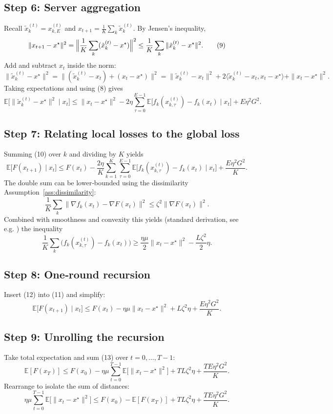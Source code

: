 \documentclass[11pt]{article}
\begin{document}
\subsection*{Step 6: Server aggregation}
Recall $\tilde x_{k}^{(t)}=x_{k,E}^{(t)}$ and $x_{t+1}=\frac1K\sum_{k}\tilde x_{k}^{(t)}$. By Jensen’s inequality,
\[
\|x_{t+1}-x^\star\|^2
= \Bigl\|\frac1K\sum_{k}( \tilde x_{k}^{(t)}-x^\star)\Bigr\|^2
\le \frac1K\sum_{k}\|\tilde x_{k}^{(t)}-x^\star\|^2 . \tag{9}
\]
Add and subtract $x_t$ inside the norm:
\[
\|\tilde x_{k}^{(t)}-x^\star\|^2
= \|(\tilde x_{k}^{(t)}-x_t)+(x_t-x^\star)\|^2
= \|\tilde x_{k}^{(t)}-x_t\|^2 +2\langle \tilde x_{k}^{(t)}-x_t, x_t-x^\star\rangle +\|x_t-x^\star\|^2 .
\]
Taking expectations and using (8) gives
\[
\mathbb{E}\!\bigl[\|\tilde x_{k}^{(t)}-x^\star\|^2\mid x_t\bigr]
\le \|x_t-x^\star\|^2
-2\eta\sum_{\tau=0}^{E-1}\mathbb{E}\!\bigl[f_k(x_{k,\tau}^{(t)})-f_k(x_t)\mid x_t\bigr]
+E\eta^2G^2 . \tag{10}
\]

\subsection*{Step 7: Relating local losses to the global loss}
Summing (10) over $k$ and dividing by $K$ yields
\[
\mathbb{E}\!\bigl[F(x_{t+1})\mid x_t\bigr]
\le F(x_t)
-\frac{2\eta}{K}\sum_{k=1}^K\sum_{\tau=0}^{E-1}\mathbb{E}\!\bigl[f_k(x_{k,\tau}^{(t)})-f_k(x_t)\mid x_t\bigr]
+\frac{E\eta^2G^2}{K}. \tag{11}
\]
The double sum can be lower‑bounded using the dissimilarity Assumption~\ref{ass:dissimilarity}:
\[
\frac1K\sum_{k}\|\nabla f_k(x_t)-\nabla F(x_t)\|^2 \le \zeta^2\|\nabla F(x_t)\|^2 .
\]
Combined with smoothness and convexity this yields (standard derivation, see e.g. \cite{fedprox}) the inequality
\[
\frac1K\sum_{k}\bigl(f_k(x_{k,\tau}^{(t)})-f_k(x_t)\bigr)
\ge \frac{\eta\mu}{2}\|x_t-x^\star\|^2 - \frac{L\zeta^2}{2}\eta . \tag{12}
\]

\subsection*{Step 8: One‑round recursion}
Insert (12) into (11) and simplify:
\[
\mathbb{E}\!\bigl[F(x_{t+1})\mid x_t\bigr]
\le F(x_t)
-\eta\mu\|x_t-x^\star\|^2
+L\zeta^2\eta
+\frac{E\eta^2G^2}{K}. \tag{13}
\]

\subsection*{Step 9: Unrolling the recursion}
Take total expectation and sum (13) over $t=0,\dots,T-1$:
\[
\mathbb{E}[F(x_T)]\le F(x_0)
-\eta\mu\sum_{t=0}^{T-1}\mathbb{E}\!\bigl[\|x_t-x^\star\|^2\bigr]
+TL\zeta^2\eta
+\frac{TE\eta^2G^2}{K}. \tag{14}
\]
Rearrange to isolate the sum of distances:
\[
\eta\mu\sum_{t=0}^{T-1}\mathbb{E}\!\bigl[\|x_t-x^\star\|^2\bigr]
\le F(x_0)-\mathbb{E}[F(x_T)]
+TL\zeta^2\eta+\frac{TE\eta^2G^2}{K}. \tag{15}
\]
\end{document}
